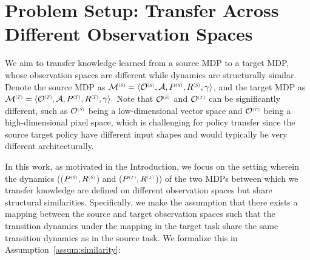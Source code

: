 \vspace{-1.5em}
\section{Problem Setup: Transfer Across Different Observation Spaces}
\label{sec:setup}
\vspace{-0.5em}

We aim to transfer knowledge learned from a source MDP to a target MDP, whose observation spaces are different while dynamics are structurally similar.
Denote the source MDP as $\mathcal{M}\source = \langle \states\source, \actions, P\source, R\source, \gamma \rangle$, and the target MDP as $\mathcal{M}\target = \langle \states\target, \actions, P\target, R\target, \gamma \rangle.$ 
Note that $\states\source$ and $\states\target$ can be significantly different, such as $\states\source$ being a low-dimensional vector space and $\states\target$ being a high-dimensional pixel space, which is challenging for policy transfer since the source target policy have different input shapes and would typically be very different architecturally. 

In this work, as motivated in the Introduction, we focus on the setting wherein the dynamics (($P\source, R\source$) and ($P\target, R\target$)) of the two MDPs between which we transfer knowledge are defined on different observation spaces but share structural similarities. Specifically, we make the assumption that there exists a mapping between the source and target observation spaces such that the transition dynamics under the mapping in the target task share the same transition dynamics as in the source task. We formalize this in Assumption~\ref{assum:similarity}:

